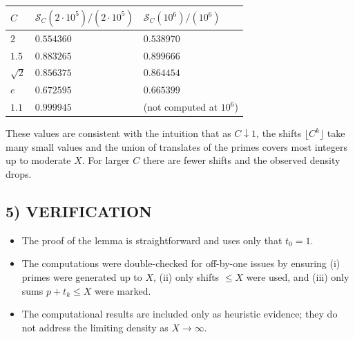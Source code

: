 \begin{center}
\begin{tabular}{@{}lll@{}}
\toprule
$C$ & $\mathcal{S}_C(2\cdot 10^5)/(2\cdot 10^5)$ & $\mathcal{S}_C(10^6)/(10^6)$ \\
\midrule
$2$ & $0.554360$ & $0.538970$ \\
$1.5$ & $0.883265$ & $0.899666$ \\
$\sqrt{2}$ & $0.856375$ & $0.864454$ \\
$e$ & $0.672595$ & $0.665399$ \\
$1.1$ & $0.999945$ & (not computed at $10^6$) \\
\bottomrule
\end{tabular}
\end{center}

These values are consistent with the intuition that as $C\downarrow 1$, the shifts $\lfloor C^k\rfloor$ take many small values and the union of translates of the primes covers most integers up to moderate $X$. For larger $C$ there are fewer shifts and the observed density drops.

\subsection*{5) VERIFICATION}
\begin{itemize}[leftmargin=2em]
\item The proof of the lemma is straightforward and uses only that $t_0=1$.
\item The computations were double-checked for off-by-one issues by ensuring (i) primes were generated up to $X$, (ii) only shifts $\le X$ were used, and (iii) only sums $p+t_k\le X$ were marked.
\item The computational results are included only as heuristic evidence; they do not address the limiting density as $X\to\infty$.
\end{itemize}

